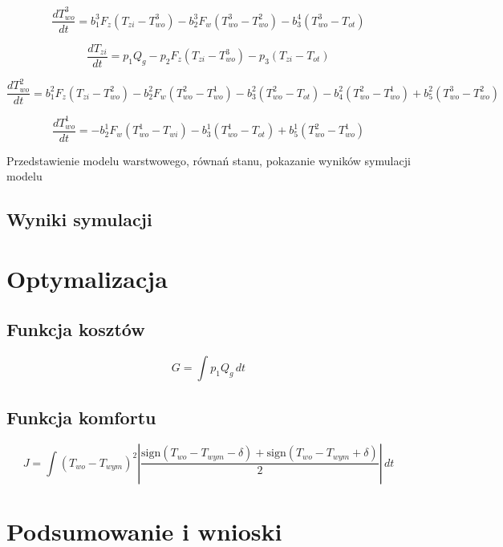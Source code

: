 \documentclass[a4paper,twoside,12pt]{book}
\begin{document}
\begin{equation}
  \frac{dT_{wo}^{3}}{dt} = b_1^3 F_z (T_{zi} - T_{wo}^{3}) - b_2^3 F_w (T_{wo}^{3} - T_{wo}^{2}) - b_3^4 (T_{wo}^{3} - T_{ot})
\end{equation}

\begin{equation}
  \frac{dT_{zi}}{dt} = p_1 Q_g - p_2 F_z (T_{zi} - T_{wo}^{3}) - p_3 (T_{zi} - T_{ot})
\end{equation}

\begin{equation}
  \frac{dT_{wo}^{2}}{dt} = b_1^2 F_z (T_{zi} - T_{wo}^{2}) - b_2^2 F_w (T_{wo}^{2} - T_{wo}^{1}) - b_3^2 (T_{wo}^{2} - T_{ot}) - b_4^2 (T_{wo}^{2} - T_{wo}^{1}) + b_5^2 (T_{wo}^{3} - T_{wo}^{2})
\end{equation}

\begin{equation}
  \frac{dT_{wo}^{1}}{dt} = -b_2^1 F_w (T_{wo}^{1} - T_{wi}) - b_3^1 (T_{wo}^{1} - T_{ot}) + b_5^1 (T_{wo}^{2} - T_{wo}^{1})
\end{equation}

Przedstawienie modelu warstwowego, równań stanu, pokazanie wyników symulacji modelu
\section{Wyniki symulacji}


\chapter{Optymalizacja}
\label{ch:06}
\section{Funkcja kosztów}
\begin{equation}
  G = \int p_1 Q_g \, dt
\end{equation}
\section{Funkcja komfortu}
\begin{equation}
  J = \int \left( T_{wo} - T_{wym} \right)^2 \left| \frac{\text{sign}(T_{wo} - T_{wym} - \delta) + \text{sign}(T_{wo} - T_{wym} + \delta)}{2} \right| \, dt
\end{equation}




\chapter{Podsumowanie i wnioski}
\end{document}

